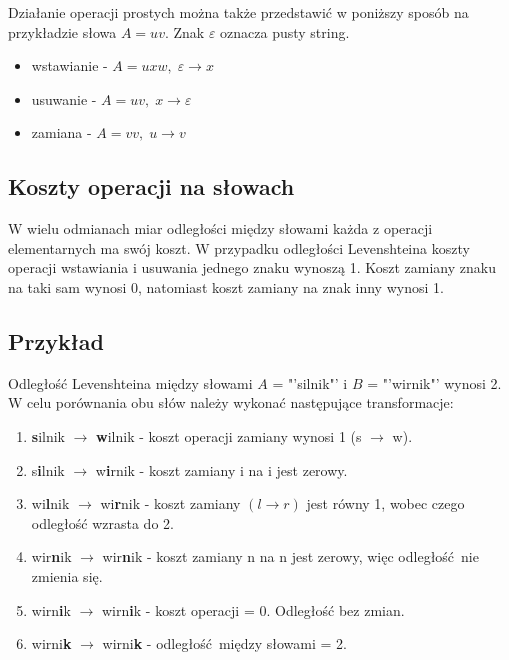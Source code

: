 \documentclass[a4paper,12pt]{article}
\begin{document}
Działanie operacji prostych można także przedstawić w poniższy
sposób na przykładzie słowa \( A = uv \). Znak \( \varepsilon \) oznacza pusty string. \cite{wiki::edit}
\begin{itemize}
    \item wstawianie - \( A = uxw, \; \varepsilon \rightarrow x \)
    \item usuwanie - \( A = uv, \; x \rightarrow \varepsilon \)
    \item zamiana - \( A = vv, \; u \rightarrow v \)
\end{itemize}

\subsection{Koszty operacji na słowach}
W wielu odmianach miar odległości między słowami każda z operacji
elementarnych ma swój koszt. W przypadku odległości Levenshteina
koszty operacji wstawiania i usuwania jednego znaku wynoszą 1.
Koszt zamiany znaku na taki sam wynosi 0, natomiast koszt zamiany
na znak inny wynosi 1.

\subsection{Przykład}
Odległość Levenshteina między słowami \( A \) = "'silnik"' i \( B \) = "'wirnik"'
wynosi 2.
W celu porównania obu słów należy wykonać następujące
transformacje:

\begin{enumerate}
    \item \textbf{s}ilnik \( \rightarrow \) \textbf{w}ilnik
          - koszt operacji zamiany wynosi 1 (s \( \rightarrow \) w).
    \item s\textbf{i}lnik \( \rightarrow \) w\textbf{i}rnik
          - koszt zamiany i na i jest zerowy.
    \item wi\textbf{l}nik \( \rightarrow \) wi\textbf{r}nik
          - koszt zamiany \( ( l \rightarrow r ) \) jest równy 1, wobec czego odległość wzrasta do 2.
    \item wir\textbf{n}ik \( \rightarrow \) wir\textbf{n}ik
          - koszt zamiany n na n jest zerowy, więc odległość nie zmienia się.
    \item wirn\textbf{i}k \( \rightarrow \) wirn\textbf{i}k - koszt operacji = 0. Odległość bez zmian.
    \item wirni\textbf{k} \( \rightarrow \) wirni\textbf{k} - odległość między słowami = 2.
\end{enumerate}
\end{document}
